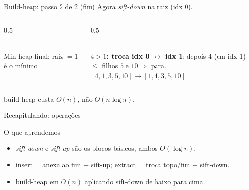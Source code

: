 \documentclass[aspectratio=169]{beamer}
\begin{document}
\begin{frame}{Build-heap: passo 2 de 2 (fim)}
  Agora \emph{sift-down} na raiz (idx 0).
  \begin{columns}[T]
    \begin{column}{0.5\textwidth}
    \centering
    \\[0.3em]
    {\footnotesize Min-heap final: raiz $=1$ é o mínimo}
    \end{column}
    \begin{column}{0.5\textwidth}
    \centering
    \\[0.6em]
    {\footnotesize \textbf{$4>1$: troca idx 0 $\leftrightarrow$ idx 1};
    depois $4$ (em idx 1) $\le$ filhos $5$ e $10\Rightarrow$ para.\\
    $[4,1,3,5,10]\to[1,4,3,5,10]$}
    \end{column}
  \end{columns}
  \begin{center}
  {\footnotesize build-heap custa $O(n)$, não $O(n\log n)$.}
  \end{center}
\end{frame}

\begin{frame}{Recapitulando: operações}
  \begin{block}{O que aprendemos}
    \begin{itemize}
      \item \emph{sift-down} e \emph{sift-up} são os blocos básicos, ambos
        $O(\log n)$.
      \item insert = anexa ao fim + sift-up; extract = troca topo/fim +
        sift-down.
      \item build-heap em $O(n)$ aplicando sift-down de baixo para cima.
    \end{itemize}
  \end{block}
\end{frame}
\end{document}
